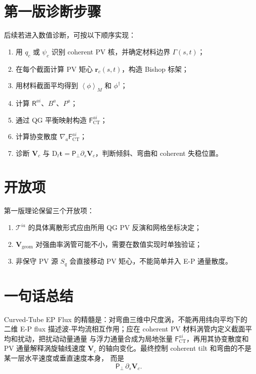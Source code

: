\documentclass[12pt,a4paper]{ctexart}
\newcommand{\p}{\partial}
\newcommand{\D}{\mathrm D}
\newcommand{\mean}[1]{\left\langle #1\right\rangle_M}
\newcommand{\fluc}[1]{#1^{\dagger}}
\newcommand{\bt}{\boldsymbol t}
\newcommand{\br}{\boldsymbol r}
\newcommand{\bV}{\boldsymbol V}
\newcommand{\PP}{\boldsymbol{\mathsf P}_{\perp}}
\newcommand{\FF}{\mathsf F_{\mathrm{CT}}}
\newcommand{\RR}{\mathsf R}
\newcommand{\GG}{\Gamma}
\newcommand{\TT}{\mathcal T}
\begin{document}
\section{第一版诊断步骤}

后续若进入数值诊断，可按以下顺序实现：
\begin{enumerate}[label=\arabic*.]
  \item 用 $q_c$ 或 $\psi_c$ 识别 coherent PV 核，并确定材料边界 $\GG(s,t)$；
  \item 在每个截面计算 PV 矩心 $\br_c(s,t)$，构造 Bishop 标架；
  \item 用材料截面平均得到 $\mean{\phi}$ 和 $\fluc{\phi}$；
  \item 计算 $\RR^{ai}$、$B^a$、$P^a$；
  \item 通过 QG 平衡映射构造 $\FF^{ai}$；
  \item 计算协变散度 $\nabla_a\FF^{ai}$；
  \item 诊断 $\bV_c$ 与 $\D_t\bt=\PP\p_s\bV_c$，判断倾斜、弯曲和 coherent 失稳位置。
\end{enumerate}

\section{开放项}

第一版理论保留三个开放项：
\begin{enumerate}[label=\arabic*.]
  \item $\TT^{ia}$ 的具体离散形式应由所用 QG PV 反演和网格坐标决定；
  \item $\boldsymbol V_{\mathrm{geom}}$ 对强曲率涡管可能不小，需要在数值实现时单独验证；
  \item 非保守 PV 源 $S_q$ 会直接移动 PV 矩心，不能简单并入 E-P 通量散度。
\end{enumerate}

\section{一句话总结}

Curved-Tube EP Flux 的精髓是：对弯曲三维中尺度涡，不能再用纬向平均下的二维 E-P flux
描述波-平均流相互作用；应在 coherent PV 材料涡管内定义截面平均和扰动，把扰动动量通量
与浮力通量合成为局地张量 $\FF^{ai}$，再用其协变散度和 PV 通量解释涡旋轴线速度
$\bV_c$ 的轴向变化。最终控制 coherent tilt 和弯曲的不是某一层水平速度或垂直速度本身，
而是
\[
  \PP\,\p_s\bV_c.
\]
\end{document}
